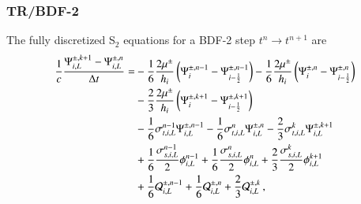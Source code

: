 \subsubsection{TR/BDF-2}
The fully discretized S$_2$ equations for a BDF-2 step
$t^{n}\rightarrow t^{n+1}$ are
\begin{equation}\lequ{S2BDF2fullL}\begin{split}
  \frac{1}{c}\frac{\Psi\iL^{\pm,k+1}-\Psi\iL^{\pm,n}}{\dt} = &
   -\sixth     \frac{2\mu^\pm}{h_i}\fn{\Psi^{\pm,n-1}_i - \Psi^{\pm,n-1}_{i-\half}}
   -\sixth     \frac{2\mu^\pm}{h_i}\fn{\Psi^{\pm,n}_i   - \Psi^{\pm,n}_{i-\half}}\\
  &-\frac{2}{3}\frac{2\mu^\pm}{h_i}\fn{\Psi^{\pm,k+1}_i - \Psi^{\pm,k+1}_{i-\half}}\\
  &-\sixth\sigma_{t,i,L}^{n-1}\Psi\iL^{\pm,n-1}
   -\sixth\sigma_{t,i,L}^{n}  \Psi\iL^{\pm,n}
   -\frac{2}{3}\sigma_{t,i,L}^k\Psi\iL^{\pm,k+1}\\
  &+\sixth\frac{\sigma_{s,i,L}^{n-1}}{2}\phi\iL^{n-1}
   +\sixth\frac{\sigma_{s,i,L}^{n}}{2}  \phi\iL^{n}
   +\frac{2}{3}\frac{\sigma_{s,i,L}^k}{2}\phi\iL^{k+1}\\
  &+\sixth\Q_{i,L}^{\pm,n-1}
   +\sixth\Q_{i,L}^{\pm,n}
   +\frac{2}{3}\Q_{i,L}^{\pm,k} \pec
\end{split}\end{equation}

